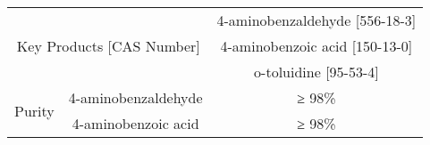 \begin{landscape}
\begin{table}[]
\begin{tabular}{@{}ccc@{}}
\multicolumn{2}{|c|}{\multirow{3}{*}{Key Products {[}CAS Number{]}}}                                                  & \multicolumn{1}{c|}{4-aminobenzaldehyde {[}556-18-3{]}}                                                                                                                                                                                                                                                                                                                                                                                    \\ \cmidrule(l){3-3} 
\multicolumn{2}{|c|}{}                                                                                                & \multicolumn{1}{c|}{4-aminobenzoic acid {[}150-13-0{]}}                                                                                                                                                                                                                                                                                                                                                                                    \\ \cmidrule(l){3-3} 
\multicolumn{2}{|c|}{}                                                                                                & \multicolumn{1}{c|}{o-toluidine {[}95-53-4{]}}                                                                                                                                                                                                                                                                                                                                                                                             \\ \midrule
\multicolumn{1}{|c|}{\multirow{3}{*}{Purity}}                              & \multicolumn{1}{c|}{4-aminobenzaldehyde} & \multicolumn{1}{c|}{≥ 98\%}                                                                                                                                                                                                                                                                                                                                                                                                                \\ \cmidrule(l){2-3} 
\multicolumn{1}{|c|}{}                                                     & \multicolumn{1}{c|}{4-aminobenzoic acid} & \multicolumn{1}{c|}{≥ 98\%}                                                                                                                                                                                                                                                                                                                                                                                                                \\ \cmidrule(l){2-3} 

\end{tabular}
\end{table}
\end{landscape}
